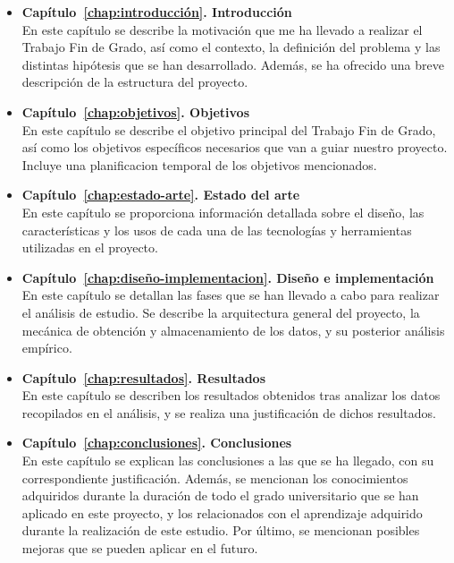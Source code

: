 \documentclass[a4paper, 12pt]{book}
\begin{document}
\begin{itemize}
  
  \item \textbf{Capítulo~\ref{chap:introducción}. Introducción}
  \\En este capítulo se describe la motivación que me ha llevado a realizar el Trabajo Fin de Grado, así
  como el contexto, la definición del problema y las distintas hipótesis que se han desarrollado. Además, se ha ofrecido una breve descripción de la estructura del proyecto.

  \item \textbf{Capítulo~\ref{chap:objetivos}. Objetivos}
  \\En este capítulo se describe el objetivo principal del Trabajo Fin de Grado, así como los objetivos específicos necesarios
  que van a guiar nuestro proyecto. Incluye una planificacion temporal de los objetivos mencionados. 
  
  \item \textbf{Capítulo~\ref{chap:estado-arte}. Estado del arte}
  \\En este capítulo se proporciona información detallada sobre el diseño, las características y los usos de cada
  una de las tecnologías y herramientas utilizadas en el proyecto.  
  
  \item \textbf{Capítulo~\ref{chap:diseño-implementacion}. Diseño e implementación}
  \\En este capítulo se detallan las fases que se han llevado a cabo para realizar el análisis de estudio. 
  Se describe la arquitectura general del proyecto, la mecánica de obtención y almacenamiento de los datos, y su posterior análisis empírico.

  \item \textbf{Capítulo~\ref{chap:resultados}. Resultados}
  \\En este capítulo se describen los resultados obtenidos tras analizar los datos recopilados en el análisis, y se 
  realiza una justificación de dichos resultados.
 
  \item \textbf{Capítulo~\ref{chap:conclusiones}. Conclusiones}
  \\En este capítulo se explican las conclusiones a las que se ha llegado, con su correspondiente justificación.
  Además, se mencionan los conocimientos adquiridos durante la duración de todo el grado universitario que se han aplicado en este proyecto, y los relacionados con el aprendizaje
  adquirido durante la realización de este estudio. Por último, se mencionan posibles mejoras que se pueden aplicar en el futuro.

\end{itemize}
\end{document}
